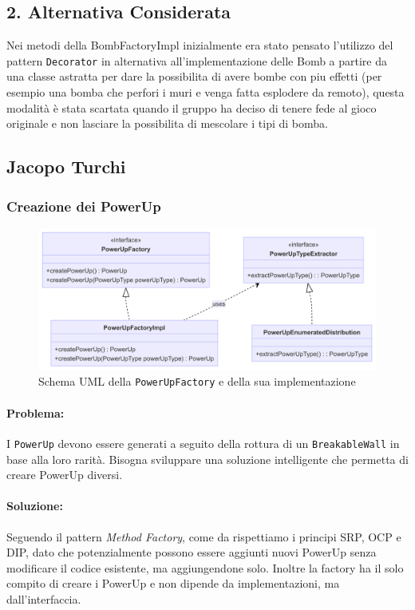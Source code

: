 \documentclass[a4paper,12pt]{report}
\begin{document}
\subsection*{2. Alternativa Considerata}
\par
Nei metodi della BombFactoryImpl inizialmente era stato pensato l'utilizzo del pattern \verb|Decorator| in alternativa all'implementazione delle Bomb a partire da una classe astratta per dare la possibilita di avere bombe con piu effetti (per esempio una bomba che perfori i muri e venga fatta esplodere da remoto), questa modalità è stata scartata quando il gruppo ha deciso di tenere fede al gioco originale e non lasciare la possibilita di mescolare i tipi di bomba.
\subsection{Jacopo Turchi}


\subsubsection{Creazione dei PowerUp}
\begin{figure}[H]
\centering{}
\includegraphics[width=1.0\columnwidth]{img/power-up-factory-uml.png}
\caption{Schema UML della \texttt{PowerUpFactory} e della sua implementazione}
\label{img:uml-power-up-factory}
\end{figure}
\paragraph{Problema:} I \texttt{PowerUp} devono essere generati a seguito della rottura di un \texttt{BreakableWall} in base alla loro rarità. Bisogna sviluppare una soluzione intelligente che permetta di creare PowerUp diversi.
\paragraph{Soluzione:} Seguendo il pattern \textit{Method Factory}, come da
 rispettiamo i principi SRP, OCP e DIP, dato che potenzialmente possono essere aggiunti nuovi PowerUp senza modificare il codice esistente, ma aggiungendone solo. Inoltre la factory ha il solo compito di creare i PowerUp e non dipende da implementazioni, ma dall'interfaccia.
\end{document}
